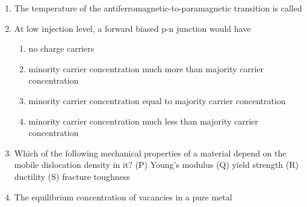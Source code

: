 \documentclass[a4paper,10pt]{article}
\begin{document}
\begin{enumerate}
    \item The temperature of the antiferromagnetic-to-paramagnetic transition is called
    
    \hfill{}
    \begin{enumerate}
    \end{enumerate}

    \item At low injection level, a forward biased p-n junction would have
    
    \hfill{}
    \begin{enumerate}
        \item no charge carriers
        \item minority carrier concentration much more than majority carrier concentration
        \item minority carrier concentration equal to majority carrier concentration
        \item minority carrier concentration much less than majority carrier concentration
    \end{enumerate}

    \item Which of the following mechanical properties of a material depend on the mobile dislocation density in it?
    (P) Young's modulus \quad (Q) yield strength \quad (R) ductility \quad (S) fracture toughness
    
    \hfill{}
    \begin{enumerate}
    \end{enumerate}

    \item The equilibrium concentration of vacancies in a pure metal
    

\end{enumerate}
\end{document}
